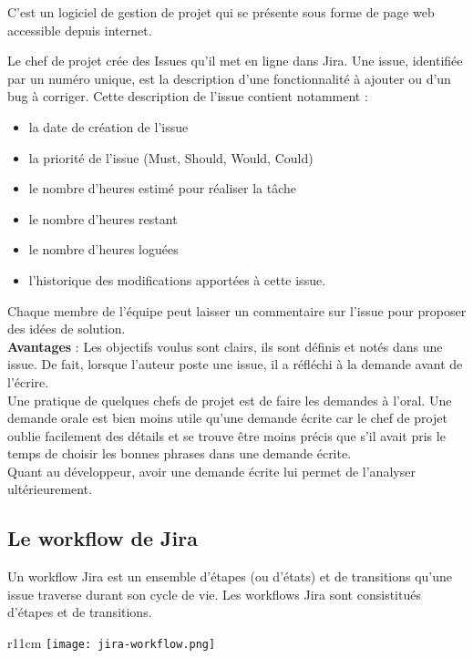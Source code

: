 C'est un logiciel de gestion de projet qui se présente sous forme de page web
accessible depuis internet.

Le chef de projet crée des Issues qu'il met en ligne dans Jira.
Une issue, identifiée par un numéro unique, est la description d'une
fonctionnalité à ajouter ou d'un bug à corriger. 
Cette description de l'issue contient notamment :
\begin{itemize}
\item la date de création de l'issue
\item la priorité de l'issue (Must, Should, Would, Could)
\item le nombre d'heures estimé pour réaliser la tâche
\item le nombre d'heures restant
\item le nombre d'heures loguées
\item l'historique des modifications apportées à cette issue.\\

\end{itemize}

Chaque membre de l'équipe peut laisser un commentaire sur l'issue pour
proposer des idées de solution.\\

\textbf{Avantages} :
Les objectifs voulus sont clairs, ils sont définis et notés dans une issue.
De fait, lorsque l'auteur poste une issue, il a réfléchi à la demande avant de
l'écrire. \\
Une pratique de quelques chefs de projet est de faire les demandes à l'oral.
Une demande orale est bien moins utile qu'une demande écrite car le chef de
projet oublie facilement des détails et se trouve être moins précis que s'il
avait pris le temps de choisir les bonnes phrases dans une demande écrite.\\
Quant au développeur, avoir une demande écrite lui permet de l'analyser
ultérieurement.


\subsection{Le workflow de Jira}

Un workflow Jira est un ensemble d'étapes (ou d'états) et de transitions qu'une
issue traverse durant son cycle de vie. Les workflows Jira sont consistitués
d'étapes et de transitions.

\begin{wrapfigure}[13]{r}{11cm}
  \texttt{[image: jira-workflow.png]}
\end{wrapfigure}


